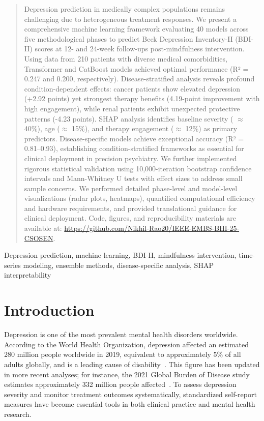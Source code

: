 \documentclass[conference]{IEEEtran}
\begin{document}
\begin{abstract}
Depression prediction in medically complex populations remains challenging due to heterogeneous treatment responses. We present a comprehensive machine learning framework evaluating 40 models across five methodological phases to predict Beck Depression Inventory-II (BDI-II) scores at 12- and 24-week follow-ups post-mindfulness intervention. Using data from 210 patients with diverse medical comorbidities, Transformer and CatBoost models achieved optimal performance (R² = 0.247 and 0.200, respectively). Disease-stratified analysis reveals profound condition-dependent effects: cancer patients show elevated depression (+2.92 points) yet strongest therapy benefits (4.19-point improvement with high engagement), while renal patients exhibit unexpected protective patterns (-4.23 points). SHAP analysis identifies baseline severity ( $\approx$ 40\%), age ($\approx$ 15\%), and therapy engagement ($\approx$ 12\%) as primary predictors. Disease-specific models achieve exceptional accuracy (R² = 0.81–0.93), establishing condition-stratified frameworks as essential for clinical deployment in precision psychiatry. We further implemented rigorous statistical validation using 10,000-iteration bootstrap confidence intervals and Mann-Whitney U tests with effect sizes to address small sample concerns. We performed detailed phase-level and model-level visualizations (radar plots, heatmaps), quantified computational efficiency and hardware requirements, and provided translational guidance for clinical deployment. Code, figures, and reproducibility materials are available at: \href{https://github.com/Nikhil-Rao20/IEEE-EMBS-BHI-25-CSOSEN}{https://github.com/Nikhil-Rao20/IEEE-EMBS-BHI-25-CSOSEN}.
\end{abstract}

\begin{IEEEkeywords}
Depression prediction, machine learning, BDI-II, mindfulness intervention, time-series modeling, ensemble methods, disease-specific analysis, SHAP interpretability
\end{IEEEkeywords}

\section{Introduction}

Depression is one of the most prevalent mental health disorders worldwide. According to the World Health Organization, depression affected an estimated 280 million people worldwide in 2019, equivalent to approximately 5\% of all adults globally, and is a leading cause of disability~\cite{WHO_Depression}. This figure has been updated in more recent analyses; for instance, the 2021 Global Burden of Disease study estimates approximately 332 million people affected~\cite{WHO_DepressionFactSheet}.
To assess depression severity and monitor treatment outcomes systematically, standardized self-report measures have become essential tools in both clinical practice and mental health research.
\end{document}
